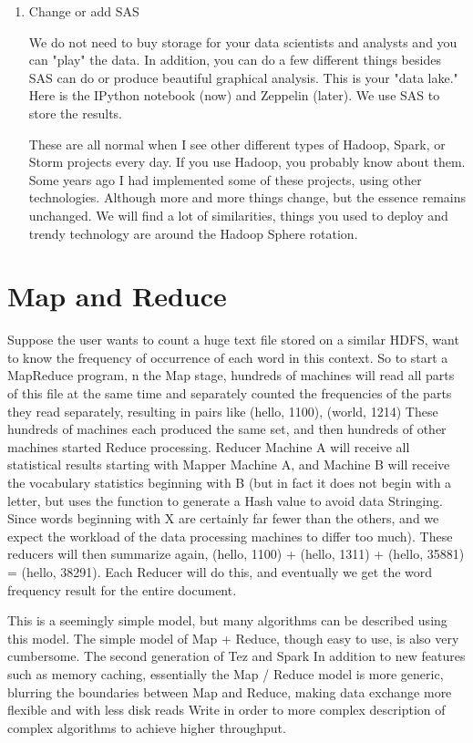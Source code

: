 \documentclass[sigconf]{acmart}
\begin{document}
\begin{enumerate}
  \item  Change or add SAS
  \par We do not need to buy storage for your data scientists and analysts and you can "play" the data. In addition, you can do a few different things besides SAS can do or produce beautiful graphical analysis.\cite{Zhou2017} This is your "data lake." Here is the IPython notebook (now) and Zeppelin (later). We use SAS to store the results.
  \par These are all normal when I see other different types of Hadoop, Spark, or Storm projects every day. If you use Hadoop, you probably know about them. Some years ago I had implemented some of these projects, using other technologies. Although more and more things change, but the essence remains unchanged. We will find a lot of similarities, things you used to deploy and trendy technology are around the Hadoop Sphere rotation.

 

\end{enumerate}

\section{Map and Reduce}
 Suppose the user wants to count a huge text file stored on a similar HDFS, want to know the frequency of occurrence of each word in this context.\cite{Zhou2017} So to start a MapReduce program, n the Map stage, hundreds of machines will read all parts of this file at the same time and separately counted the frequencies of the parts they read separately, resulting in pairs like (hello, 1100), (world, 1214) These hundreds of machines each produced the same set, and then hundreds of other machines started Reduce processing. Reducer Machine A will receive all statistical results starting with Mapper Machine A, and Machine B will receive the vocabulary statistics beginning with B (but in fact it does not begin with a letter, but uses the function to generate a Hash value to avoid data Stringing.\cite{Zhou2017} Since words beginning with X are certainly far fewer than the others, and we expect the workload of the data processing machines to differ too much). These reducers will then summarize again, (hello, 1100) + (hello, 1311) + (hello, 35881) = (hello, 38291). Each Reducer will do this, and eventually we get the word frequency result for the entire document.

\par This is a seemingly simple model, but many algorithms can be described using this model. The simple model of Map + Reduce, though easy to use, is also very cumbersome. The second generation of Tez and Spark In addition to new features such as memory caching, essentially the Map / Reduce model is more generic, blurring the boundaries between Map and Reduce, making data exchange more flexible and with less disk reads Write in order to more complex description of complex algorithms to achieve higher throughput.
\end{document}
